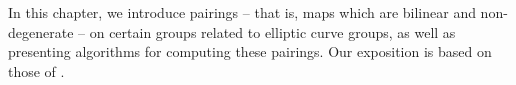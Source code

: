In this chapter, we introduce pairings -- that is, maps which are bilinear and non-degenerate -- on certain groups related to elliptic curve groups, as well as presenting algorithms for computing these pairings. Our exposition is based on those of \citep{Galbraith,Washington}.
